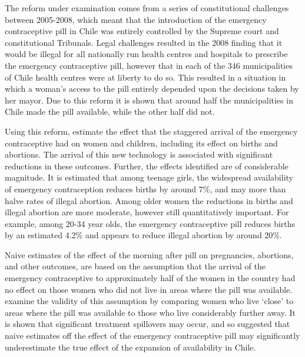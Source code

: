 The reform under examination comes from a series of constitutional challenges 
between 2005-2008, which meant that the introduction of the emergency contraceptive 
pill in Chile was entirely controlled by the Supreme court and constitutional 
Tribunals.  Legal challenges resulted in the 2008 finding that it would be illegal 
for all nationally run health centres and hospitals to prescribe the emergency 
contraceptive pill, however that in each of the 346 municipalities of Chile health 
centres were at liberty to do so.  This resulted  in a situation in which a woman's 
access to the pill entirely depended upon the decisions taken by her mayor.  Due 
to this reform it is shown that around half the municipalities in Chile made the 
pill available, while the other half did not.

Using this reform, \Person estimate the effect that the staggered arrival of the 
emergency contraceptive had on women and children, including its effect on births 
and abortions.  The arrival of this new technology is associated with significant 
reductions in these outcomes.  Further, the effects identified are of considerable
magnitude.  It is estimated that among teenage girls, the widespread availability 
of emergency contraception reduces births by around 7\%, and may more than halve 
rates of illegal abortion.  Among older women the reductions in births and illegal 
abortion are more moderate, however still quantitatively important.  For example, 
among 20-34 year olds, the emergency contraceptive pill reduces births by an 
estimated 4.2\% and appears to reduce illegal abortion by around 20\%.

\nocite{Goldin2006, Bailey2011}
\nocite{KearnerLevine2009}
\nocite{Ananatetal2007,ThomasDouglas1996,Levineetal1996}

Naive estimates of the effect of the morning after pill on pregnancies, 
abortions, and other outcomes, are based on the assumption that the arrival of
the emergency contraceptive to approximately half of the women in the country
had no effect on those women who did not live in areas where the pill was
available.  \Person examine the validity of this assumption by comparing women 
who live `close' to areas where the pill was available to those who live
considerably further away.  It is shown that significant treatment spillovers
may occur, and so suggested that naive estimates off the effect of the emergency 
contraceptive pill may significantly underestimate the true effect of the 
expansion of availability in Chile.

